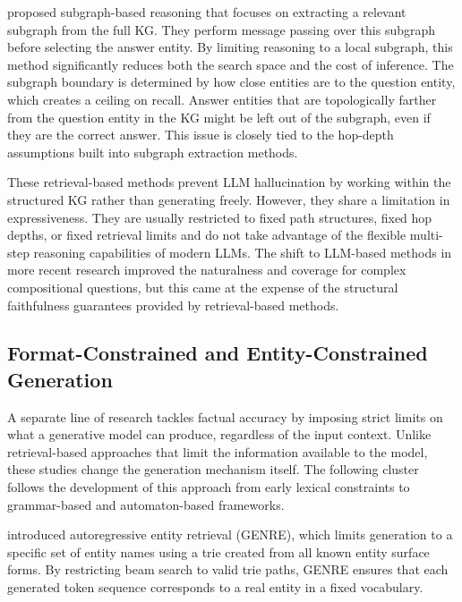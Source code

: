 \citet{zhang2022subgraph} proposed subgraph-based reasoning that focuses on extracting a relevant subgraph from the full KG. They perform message passing over this subgraph before selecting the answer entity. By limiting reasoning to a local subgraph, this method significantly reduces both the search space and the cost of inference. The subgraph boundary is determined by how close entities are to the question entity, which creates a ceiling on recall. Answer entities that are topologically farther from the question entity in the KG might be left out of the subgraph, even if they are the correct answer. This issue is closely tied to the hop-depth assumptions built into subgraph extraction methods.

These retrieval-based methods prevent LLM hallucination by working within the structured KG rather than generating freely. However, they share a limitation in expressiveness. They are usually restricted to fixed path structures, fixed hop depths, or fixed retrieval limits and do not take advantage of the flexible multi-step reasoning capabilities of modern LLMs. The shift to LLM-based methods in more recent research improved the naturalness and coverage for complex compositional questions, but this came at the expense of the structural faithfulness guarantees provided by retrieval-based methods.

\subsection{Format-Constrained and Entity-Constrained Generation}

A separate line of research tackles factual accuracy by imposing strict limits on what a generative model can produce, regardless of the input context. Unlike retrieval-based approaches that limit the information available to the model, these studies change the generation mechanism itself. The following cluster follows the development of this approach from early lexical constraints to grammar-based and automaton-based frameworks.

\citet{decao2021autoregressive} introduced autoregressive entity retrieval (GENRE), which limits generation to a specific set of entity names using a trie created from all known entity surface forms. By restricting beam search to valid trie paths, GENRE ensures that each generated token sequence corresponds to a real entity in a fixed vocabulary.


